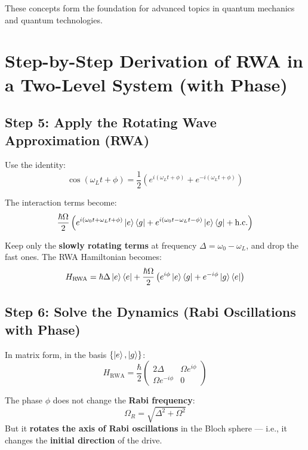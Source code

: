 These concepts form the foundation for advanced topics in quantum mechanics and quantum technologies.


















\section*{Step-by-Step Derivation of RWA in a Two-Level System (with Phase)}
\subsection*{Step 5: Apply the Rotating Wave Approximation (RWA)}

Use the identity:
\begin{equation}
	\cos(\omega_L t + \phi) = \frac{1}{2}\left(e^{i(\omega_L t + \phi)} + e^{-i(\omega_L t + \phi)} \right)
\end{equation}

The interaction terms become:
\begin{equation}
	\frac{\hbar\Omega}{2} \left( e^{i(\omega_0 t + \omega_L t + \phi)} \ket{e}\bra{g} + e^{i(\omega_0 t - \omega_L t - \phi)} \ket{e}\bra{g} + \text{h.c.} \right)
\end{equation}

Keep only the \textbf{slowly rotating terms} at frequency \(\Delta = \omega_0 - \omega_L\), and drop the fast ones. The RWA Hamiltonian becomes:
\begin{equation}
	H_{\text{RWA}} = \hbar \Delta \ket{e}\bra{e} + \frac{\hbar \Omega}{2} \left( e^{i\phi} \ket{e}\bra{g} + e^{-i\phi} \ket{g}\bra{e} \right)
\end{equation}

\subsection*{Step 6: Solve the Dynamics (Rabi Oscillations with Phase)}

In matrix form, in the basis \(\{ \ket{e}, \ket{g} \}\):
\begin{equation}
	H_{\text{RWA}} = \frac{\hbar}{2}
	\begin{pmatrix}
		2\Delta           & \Omega e^{i\phi} \\
		\Omega e^{-i\phi} & 0
	\end{pmatrix}
\end{equation}

The phase \(\phi\) does not change the \textbf{Rabi frequency}:
\begin{equation}
	\Omega_R = \sqrt{\Delta^2 + \Omega^2}
\end{equation}
But it \textbf{rotates the axis of Rabi oscillations} in the Bloch sphere — i.e., it changes the \textbf{initial direction} of the drive.
